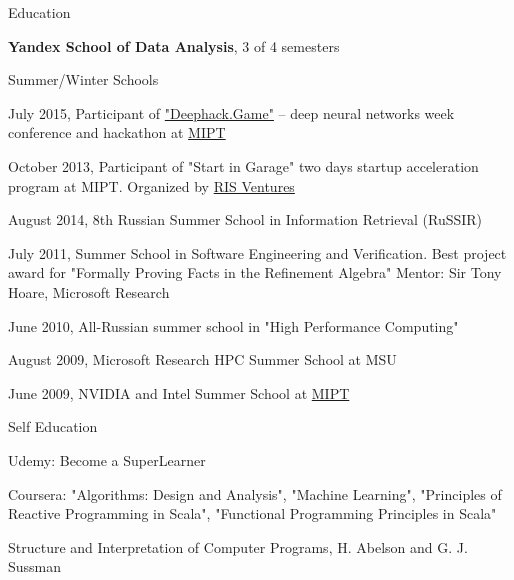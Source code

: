 \documentclass{resume} %
\begin{document}
\begin{rSection}{Education}

\textbf{Yandex School of Data Analysis}, 3 of 4 semesters 


\begin{rSubsectionSchools}{Summer/Winter Schools}
\item July 2015, Participant of \href{http://deephack.me/}{"Deephack.Game"} -- deep neural networks week conference and hackathon at \href{http://mipt.ru/}{MIPT}
\item October 2013, Participant of "Start in Garage" two days startup acceleration program at MIPT. Organized by \href{http://www.risventures.com/}{RIS Ventures}
\item August 2014, 8th Russian Summer School in Information Retrieval (RuSSIR)
\item July 2011, Summer School in Software Engineering and Verification. Best project award for "Formally Proving Facts in the Refinement Algebra" Mentor: Sir Tony Hoare, Microsoft Research
\item June 2010, All-Russian summer school in "High Performance Computing"
\item August 2009, Microsoft Research HPC Summer School at MSU
\item June 2009, NVIDIA and Intel Summer School at \href{http://mipt.ru/}{MIPT}
\end{rSubsectionSchools}


\begin{rSubsectionSchools}{Self Education}
\item Udemy: Become a SuperLearner
\item Coursera: "Algorithms: Design and Analysis", "Machine Learning", "Principles of Reactive Programming in Scala", "Functional Programming Principles in Scala"
\item Structure and Interpretation of Computer Programs, H. Abelson and G. J. Sussman 
\end{rSubsectionSchools}

\end{rSection}

\end{document}
